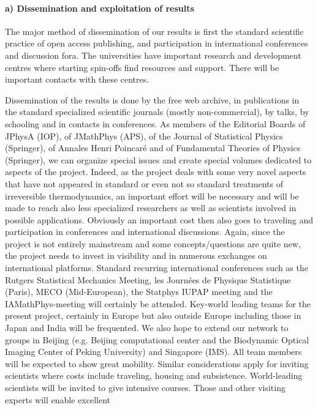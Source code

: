 \paragraph{a) Dissemination and exploitation of results}

The major method of dissemination of our results is first the standard scientific practice
of open access publishing, and participation in international conferences and discussion
fora. The universities have important research and development centres where starting
spin-offs find resources and support.
%
There will be important contacts with these centres.

Dissemination of the results is done by the free web archive, in publications in the
standard specialized scientific journals (mostly non-commercial), by talks, by schooling and
in contacts in conferences. As members of the Editorial Boards of JPhysA (IOP), of JMathPhys
(APS), of the Journal of Statistical Physics (Springer), of Annales Henri Poincar\'e and of
Fundamental Theories of Physics (Springer), we can organize special issues and create
special volumes dedicated to aspects of the project. Indeed, as the project deals with some
very novel aspects that have not appeared in standard or even not so standard treatments of
irreversible thermodynamics, an important effort will be necessary and will be made to reach
also less specialized researchers as well as scientists involved in possible applications.
%
Obviously an important cost then also goes to traveling and participation in conferences and
international discussions. Again, since the project is not entirely mainstream and some
concepts/questions are quite new, the project needs to invest in visibility and in numerous
exchanges on international platforms. Standard recurring international conferences such as
the Rutgers Statistical Mechanics Meeting, les Journ\'ees de Physique Statistique (Paris),
MECO (Mid-European), the Statphys IUPAP meeting and the IAMathPhys-meeting will certainly be
attended.  Key-world leading teams for the present project, certainly in Europe but also
outside Europe including those in Japan and India will be frequented. We also hope to extend
our network to groups in Beijing (e.g. Beijing computational center and the Biodynamic
Optical Imaging Center of Peking University) and Singapore (IMS).  All team members will be
expected to show great mobility.  Similar considerations apply for inviting scientists where
costs include traveling, housing and subsistence. World-leading scientists will be invited
to give intensive courses.  Those and other visiting experts will enable excellent
